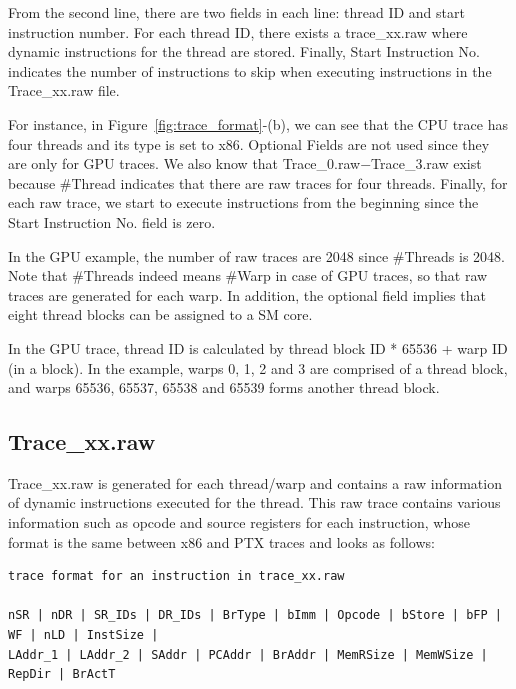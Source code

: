 From the second line, there are two fields in each line: thread ID and start
instruction number.  For each thread ID, there exists a trace\_xx.raw where
dynamic instructions for the thread are stored. Finally, Start Instruction No.
indicates the number of instructions to skip when executing instructions in the
Trace\_xx.raw file.

For instance, in Figure~\ref{fig:trace_format}-(b), we can see that the CPU
trace has four threads and its type is set to x86. Optional Fields are not used 
since they are only for GPU traces. We also know that Trace\_0.raw$-$Trace\_3.raw 
exist because \#Thread indicates that there are raw traces for four threads. 
Finally, for each raw trace, we start to execute instructions from the beginning
since the Start Instruction No. field is zero.

In the GPU example, the number of raw traces are 2048 since \#Threads is 2048.
Note that \#Threads indeed means \#Warp in case of GPU traces, so that raw traces
are generated for each warp. In addition, the optional field implies that eight 
thread blocks can be assigned to a SM core. 

In the GPU trace, thread ID is calculated by thread block ID * 65536 + warp ID (in a block). 
In the example, warps 0, 1, 2 and 3 are comprised of a thread block, and warps 65536, 65537, 65538
and 65539 forms another thread block.

\subsection{Trace\_xx.raw}

Trace\_xx.raw is generated for each thread/warp and contains a raw information
of dynamic instructions executed for the thread. This raw trace contains various
information such as opcode and source registers for each instruction, whose format 
is the same between x86 and PTX traces and looks as follows:


\begin{Verbatim}
trace format for an instruction in trace_xx.raw

nSR | nDR | SR_IDs | DR_IDs | BrType | bImm | Opcode | bStore | bFP | WF | nLD | InstSize |
LAddr_1 | LAddr_2 | SAddr | PCAddr | BrAddr | MemRSize | MemWSize | RepDir | BrActT 
\end{Verbatim}


